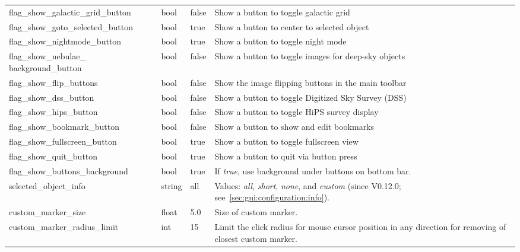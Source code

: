 \begin{longtable}{p{50mm}|l|l|p{55mm}}
flag\_show\_galactic\_grid\_button     & bool  & false & Show a button to toggle galactic grid\\
flag\_show\_goto\_selected\_button     & bool  & true  & Show a button to center to selected object\\
flag\_show\_nightmode\_button          & bool  & true  & Show a button to toggle night mode\\
flag\_show\_nebulae\_ \mbox{background\_button} & bool & false & Show a button to toggle images for deep-sky objects\\%
flag\_show\_flip\_buttons              & bool  & false & Show the image flipping buttons in the main toolbar \\%
flag\_show\_dss\_button                & bool  & false & Show a button to toggle Digitized Sky Survey (DSS)\\%
flag\_show\_hips\_button               & bool  & false & Show a button to toggle HiPS survey display\\%
flag\_show\_bookmark\_button           & bool  & false & Show a button to show and edit bookmarks\\
flag\_show\_fullscreen\_button         & bool  & true  & Show a button to toggle fullscreen view\\
flag\_show\_quit\_button               & bool  & true  & Show a button to quit via button press\\
flag\_show\_buttons\_background        & bool  & true  & If \emph{true}, use background under buttons on bottom bar.\\\midrule
%
selected\_object\_info            & string & all  & Values: \emph{all}, \emph{short}, \emph{none}, 
                                                    and \emph{custom} (since V0.12.0; see~\ref{sec:gui:configuration:info}).\\\midrule
custom\_marker\_size             & float   & 5.0 & Size of custom marker.\\%
custom\_marker\_radius\_limit    & int   & 15 & Limit the click radius for mouse cursor position in any direction for removing of closest custom marker.\\\midrule

\end{longtable}
